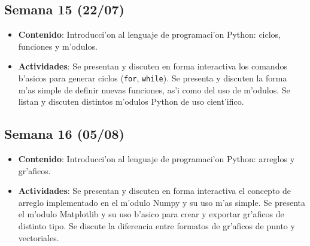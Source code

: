 \documentclass[letterpaper,11pt]{exam}
\begin{document}
\begin{multicols}{2}
\begin{scriptsize}
\subsection*{Semana 15 (22/07)}
\begin{itemize}
\item \textbf{Contenido}: Introducci'on al lenguaje de programaci'on Python: ciclos, funciones y m'odulos.
\item \textbf{Actividades}: Se presentan y discuten en forma interactiva los comandos b'asicos para generar ciclos (\texttt{for}, \texttt{while}). Se presenta y discuten la forma m'as simple de definir nuevas funciones, as'i como del uso de m'odulos. Se listan y discuten distintos m'odulos Python de uso cient'ifico.
\end{itemize}

\subsection*{Semana 16 (05/08)}
\begin{itemize}
\item \textbf{Contenido}: Introducci'on al lenguaje de programaci'on Python: arreglos y gr'aficos. 
\item \textbf{Actividades}: Se presentan y discuten en forma interactiva el concepto de arreglo implementado en el m'odulo Numpy y su uso m'as simple. Se presenta el m'odulo Matplotlib y su uso b'asico para crear y exportar gr'aficos de distinto tipo. Se discute la diferencia entre formatos de gr'aficos de punto y vectoriales.
\end{itemize}
\end{scriptsize}
\end{multicols}
\end{document}
